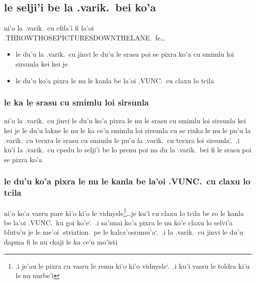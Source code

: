 \documentclass{report}
\newcommand\sds{\spacefactor\sfcode`.\ \space}
\begin{document}
\subsection{le selji'i be la .varik.\ bei ko'a}
ni'o la .varik.\ cu cfifa'i fi la'oi .THROWTHOSEPICTURESDOWNTHELANE.\ fe\ldots
\begin{itemize}
	\item le du'u la .varik.\ cu jinvi le du'u le srasu poi se pixra ko'a cu smimlu loi sirsunla kei kei je
	\item le du'u ko'a pixra le nu le kanla be la'oi .VUNC.\ cu claxu lo tcila
\end{itemize}

\subsubsection{le ka le srasu cu smimlu loi sirsunla}
ni'o la .varik.\ cu jinvi le du'u ko'a pixra le nu le srasu cu smimlu loi sirsunla kei kei je le du'u lakne le nu le ka ce'u smimlu loi sirsunla cu se rinka le nu le pu'u la .varik.\ cu terxra le srasu cu smimlu le pu'u la .varik.\ cu terxra loi sirsunla\sds  .i ku'i la .varik.\ cu cpedu lo selji'i be lo prenu poi na du la .varik.\ bei fi le srasu poi se pixra ko'a

\subsubsection{le du'u ko'a pixra le nu le kanla be la'oi .VUNC.\ cu claxu lo tcila}
ni'o ko'a vasru pare ki'o ki'o le vidnysle\footnote{.i je'au le pixra cu vasru le remu ki'o ki'o vidnysle\sds  .i ku'i vasru le toldra ki'u le nu nurbe'i}\ldots je ku'i cu claxu lo tcila be ro le kanla be la'oi .VUNC.\ ku goi ko'e\sds  .i sa'unai ko'a pixra le nu ko'e claxu lo selvi'a blutu'u je le me'oi .striation.\ pe le kalca'osrumu'a\sds  .i la .varik.\ cu jinvi le du'u dapma fi le nu ckaji le ka ce'u mo'isti
\end{document}
